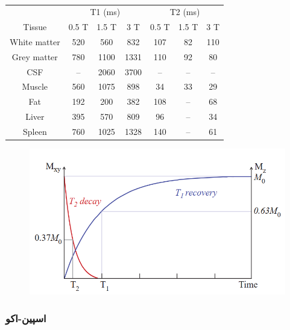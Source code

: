 \begin{table}[b!]
	\centering
	\begin{latin}
		\begin{copyrightBox}{0.7\linewidth}{\scriptsize{}}
			\begin{tabular}{|c|ccc|ccc|}
				\hline \rowcolor{headerColor}
				& \multicolumn{3}{c|}{T1 (ms)} & \multicolumn{3}{c|}{T2 (ms)} \\
				\rowcolor{headerColor} Tissue & 0.5 T & 1.5 T & 3 T & 0.5 T & 1.5 T & 3 T \\\hline\hline
				White matter & 520 & 560 & 832 & 107 & 82 & 110 \\
				Grey matter & 780 & 1100 & 1331 & 110 & 92 & 80 \\
				CSF  & –  & 2060 & 3700 & – & – & – \\
				Muscle & 560 & 1075 & 898 & 34 & 33 & 29 \\
				Fat & 192 & 200 & 382 & 108 & – & 68 \\
				Liver & 395 & 570 & 809 & 96 & – & 34 \\
				Spleen & 760 & 1025 & 1328 & 140 & – & 61 \\\hline
			\end{tabular}
		\end{copyrightBox}
	\end{latin}
	\removevspace[1.]
	\caption{}
\end{table}



\begin{figure}[t!]
	\centering
	\includegraphics[width=0.5\linewidth]{chapters/chapter-2/figs/t1-t2-ralaxation-time}
	\removevspace
	\caption{}
	\label{fig:t1-t2-ralaxation-time}
\end{figure}

\subsubsection{اسپین-اکو}

